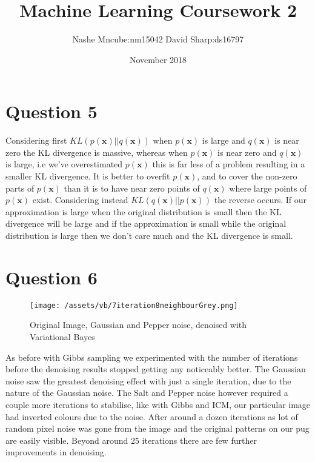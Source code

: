 \documentclass[10pt]{article}
\title{Machine Learning Coursework 2}
\author{Nashe Mncube:nm15042 David Sharp:ds16797}
\date{November 2018}
\begin{document}
    \maketitle

    \section{Question 5}
    Considering first $KL(p(\mathbf{x})||q(\mathbf{x}))$ when $p(\mathbf{x})$ is large and $q(\mathbf{x})$ is near zero
    the KL divergence is massive, whereas when $p(\mathbf{x})$ is near zero and $q(\mathbf{x})$ is large, i.e we've
    overestimated $p(\mathbf{x})$ this is far less of a problem resulting in a smaller KL divergence.
    It is better to overfit $p(\mathbf{x})$, and to cover the non-zero parts of $p(\mathbf{x})$ than it is
    to have near zero points of $q(\mathbf{x})$ where large points of $p(\mathbf{x})$ exist.
    Considering instead $KL(q(\mathbf{x})||p(\mathbf{x}))$ the reverse occurs. If our approximation is large when the
    original distribution is small then the KL divergence will be large and if the approximation is small while the
    original distribution is large then we don't care much and the KL divergence is small.

    \section{Question 6}

    \begin{figure}[h]
        \caption{Original Image, Gaussian and Pepper noise, denoised with Variational Bayes}
        \centering
        \texttt{[image: /assets/vb/7iteration8neighbourGrey.png]}
        \label{fig:variationalBayes}
    \end{figure}

    As before with Gibbs sampling we experimented with the number of iterations before the denoising results stopped
    getting any noticeably better. The Gaussian noise saw the greatest denoising effect with just a single iteration,
    due to the nature of the Gaussian noise.
    The Salt and Pepper noise however required a couple more iterations to stabilise, like with Gibbs and ICM, our particular
    image had inverted colours due to the noise. After around a dozen iterations as lot of random pixel noise was gone
    from the image and the original patterns on our pug are easily visible. Beyond around 25 iterations there are
    few further improvements in denoising.




  
\end{document}

